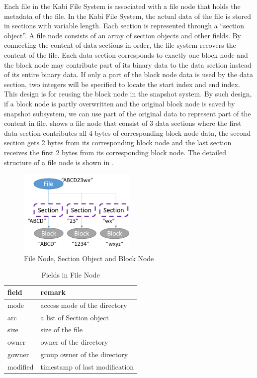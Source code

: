     Each file in the Kabi File System is associated with a file node that holds the metadata of the file. In the Kabi File System, the actual data of the file is stored in sections with variable length. Each section is represented through a ``section object''. A file node consists of an array of section objects and other fields. By connecting the content of data sections in order, the file system recovers the content of the file. Each data section corresponds to exactly one block node and the block node may contribute part of its binary data to the data section instead of its entire binary data. If only a part of the block node data is used by the data section, two integers will be specified to locate the start index and end index. This design is for reusing the block node in the snapshot system. By such design, if a block node is partly overwritten and the original block node is saved by snapshot subsystem, we can use part of the original data to represent part of the content in file.  shows a file node that consist of 3 data sections where the first data section contributes all 4 bytes of corresponding block node data, the second section gets 2 bytes from its corresponding block node and the last section receives the first 2 bytes from its corresponding block node. The detailed structure of a file node is shown in .

\begin{figure}[t]
\centering
\includegraphics[width=0.5\textwidth]{Chapter-3/figs/fig7.png}
\caption{File Node, Section Object and Block Node}
\label{fig:file_and_section}
\end{figure}


\begin{table}[t]
\begin{center}
\begin{tabular}{ll}
\toprule
field & remark\\
\midrule
mode & access mode of the directory\\
arc & a list of Section object\\
size & size of the file\\
owner & owner of the directory\\
gowner & group owner of the directory\\
modified & timestamp of last modification\\
\bottomrule
\end{tabular}
\end{center}
\caption{Fields in File Node}
\label{tab:file_fields}
\end{table}

